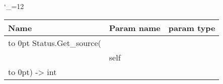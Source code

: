 \begingroup \catcode`\_=12 \tt
\begin{tabular}{lll}
\toprule
\textrm{Name}&\textrm{Param name}&\textrm{param type}\\
\midrule
\hbox to 0pt {Status.Get_source(\hss}\\
& self\\
\hbox to 0pt{) -> int\hss}\\
\bottomrule
\end{tabular}
\endgroup
